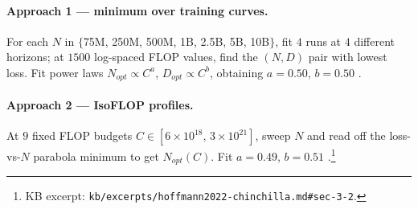 \paragraph{Approach 1 --- minimum over training curves.}
For each $N$ in $\{$75M, 250M, 500M, 1B, 2.5B, 5B, 10B$\}$,
fit $4$ runs at $4$ different
horizons; at $1500$ log-spaced FLOP values, find the $(N, D)$ pair
with lowest loss. Fit power laws $N_{opt} \propto C^a$,
$D_{opt} \propto C^b$, obtaining $a = 0.50$, $b = 0.50$
\citep[\S 3.1]{hoffmann2022-chinchilla}.

\paragraph{Approach 2 --- IsoFLOP profiles.}
At $9$ fixed FLOP budgets $C \in [6 \times 10^{18},\, 3 \times 10^{21}]$,
sweep $N$ and read off the loss-vs-$N$ parabola minimum to get
$N_{opt}(C)$. Fit $a = 0.49$, $b = 0.51$
\citep[\S 3.2]{hoffmann2022-chinchilla}.\footnote{KB excerpt:
\nolinkurl{kb/excerpts/hoffmann2022-chinchilla.md#sec-3-2}.}

